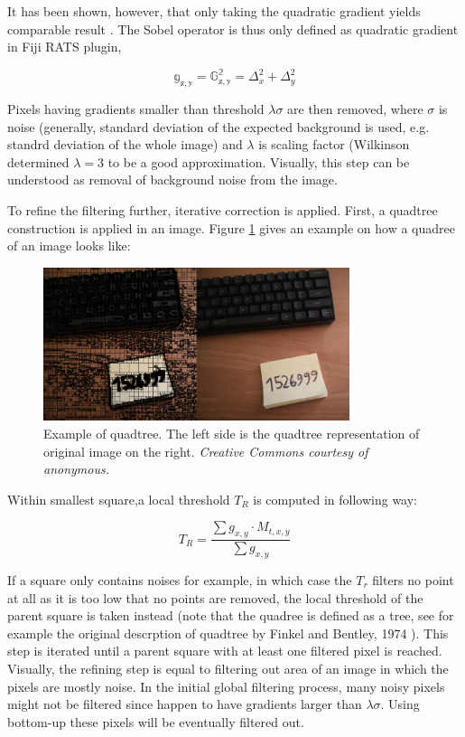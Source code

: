 \documentclass[pdftex,12pt,a4paper]{report}
\begin{document}
It has been shown, however, that only taking the quadratic gradient yields comparable result \cite{wilkinson1998digital}. The Sobel operator is thus only defined as quadratic gradient in Fiji RATS plugin,

$$
\mathbb{g_{x, y}} = \mathbb{G_{x, y}^2} = \Delta_x^2 + \Delta_y^2
$$

Pixels having gradients smaller than threshold $\lambda \sigma$ are then removed, where $\sigma$ is noise (generally, standard deviation of the expected background is used, e.g. standrd deviation of the whole image) and $\lambda$ is scaling factor (Wilkinson determined $\lambda = 3$ to be a good approximation. Visually, this step can be understood as removal of background noise from the image.

To refine the filtering further, iterative correction is applied. First, a quadtree construction is applied in an image. Figure \ref{fig:quadtree} gives an example on how a quadree of an image looks like:

\begin{figure}[H]
\centering
\includegraphics[width=0.8\textwidth]{images/quadtree}
\caption{Example of quadtree. The left side is the quadtree representation of original image on the right. \textit{Creative Commons courtesy of anonymous.}}
\label{fig:quadtree}
\end{figure}

Within smallest square,a local threshold $T_R$ is computed in following way:

$$
T_R = \frac{\sum g_{x,y} \cdot M_{t, x, y}}{\sum g_{x, y}}
$$

If a square only contains noises for example, in which case the $T_r$ filters no point at all as it is too low that no points are removed, the local threshold of the parent square is taken instead (note that the quadree is defined as a tree, see for example the original descrption of quadtree by Finkel and Bentley, 1974 \cite{finkel1974quad}). This step is iterated until a parent square with at least one filtered pixel is reached. Visually, the refining step is equal to filtering out area of an image in which the pixels are mostly noise. In the initial global filtering process, many noisy pixels might not be filtered since happen to have gradients larger than $\lambda \sigma$. Using bottom-up these pixels will be eventually filtered out.
\end{document}
